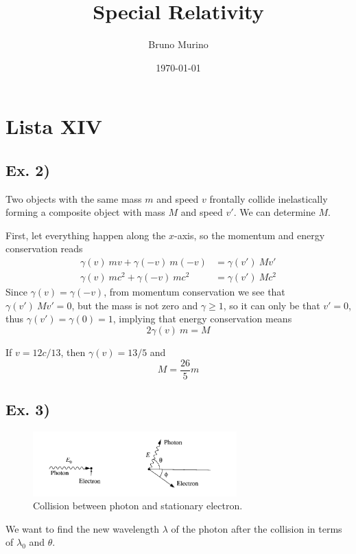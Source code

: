 \documentclass[oneside, 10pt, notitlepage]{book}
\title{Special Relativity} %
\author{Bruno Murino} %
\date{\today} %
\begin{document}
\chapter{Lista XIV}

\section*{Ex. 2)}
Two objects with the same mass \(m\) and speed \(v\) frontally collide inelastically forming a composite object with mass \(M\) and speed \(v'\). We can determine \(M\).

First, let everything happen along the \(x\)-axis, so the momentum and energy conservation reads
\begin{equation}
\begin{split}
    \gamma(v)\ m v + \gamma(-v)\ m(-v) &= \gamma(v')\ M v' \\
    \gamma(v)\  m c^2 + \gamma(-v)\ m c^2 &= \gamma(v')\ M c^2
\end{split}
\end{equation}
Since \(\gamma(v)=\gamma(-v)\), from momentum conservation we see that \(\gamma(v')\ M v'=0\), but the mass is not zero and \(\gamma \geq 1\), so it can only be that \(v'=0\), thus \(\gamma(v')=\gamma(0)=1\), implying that energy conservation means
\begin{equation}
    2\gamma(v)\ m = M
\end{equation}

If \(v = 12c/13\), then \(\gamma(v) = 13/5\) and 
\begin{equation}
    M = \frac{26}{5}m
\end{equation}

\section*{Ex. 3)}

\begin{figure}[H]
    \centering
    \includegraphics[width=0.7\textwidth]{L14_3}
    \caption{Collision between photon and stationary electron.}
    \label{fig:L14_3}
\end{figure}

We want to find the new wavelength \(\lambda\) of the photon after the collision in terms of \(\lambda_0\) and \(\theta\).
\end{document}
